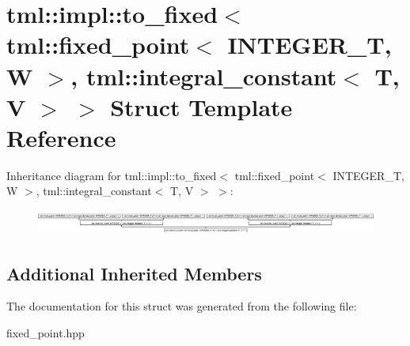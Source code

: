 \hypertarget{structtml_1_1impl_1_1to__fixed_3_01tml_1_1fixed__point_3_01INTEGER__T_00_01W_01_4_00_01tml_1_1in9d9d8d10eea2486ba9d67c31bb536366}{\section{tml\+:\+:impl\+:\+:to\+\_\+fixed$<$ tml\+:\+:fixed\+\_\+point$<$ I\+N\+T\+E\+G\+E\+R\+\_\+\+T, W $>$, tml\+:\+:integral\+\_\+constant$<$ T, V $>$ $>$ Struct Template Reference}
\label{structtml_1_1impl_1_1to__fixed_3_01tml_1_1fixed__point_3_01INTEGER__T_00_01W_01_4_00_01tml_1_1in9d9d8d10eea2486ba9d67c31bb536366}
}
Inheritance diagram for tml\+:\+:impl\+:\+:to\+\_\+fixed$<$ tml\+:\+:fixed\+\_\+point$<$ I\+N\+T\+E\+G\+E\+R\+\_\+\+T, W $>$, tml\+:\+:integral\+\_\+constant$<$ T, V $>$ $>$\+:\begin{figure}[H]
\begin{center}
\leavevmode
\includegraphics[height=0.833333cm]{structtml_1_1impl_1_1to__fixed_3_01tml_1_1fixed__point_3_01INTEGER__T_00_01W_01_4_00_01tml_1_1in9d9d8d10eea2486ba9d67c31bb536366}
\end{center}
\end{figure}
\subsection*{Additional Inherited Members}


The documentation for this struct was generated from the following file\+:\begin{DoxyCompactItemize}
\item 
fixed\+\_\+point.\+hpp\end{DoxyCompactItemize}
